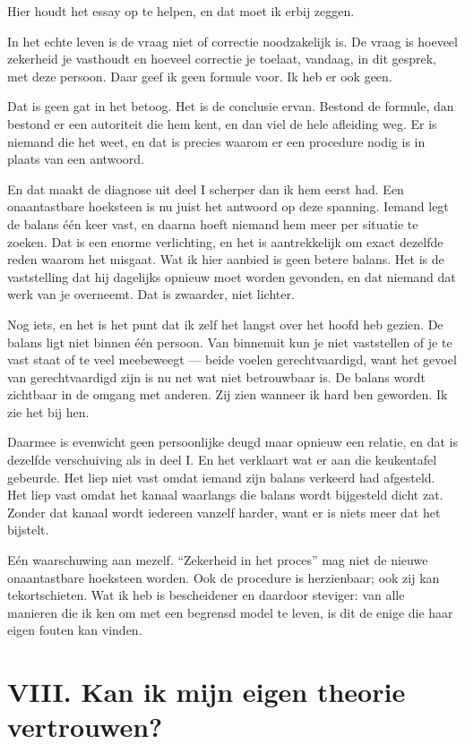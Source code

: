 \documentclass[11pt,a4paper]{article}
\begin{document}
Hier houdt het essay op te helpen, en dat moet ik erbij zeggen.

In het echte leven is de vraag niet of correctie noodzakelijk is. De vraag is hoeveel zekerheid je vasthoudt en hoeveel correctie je toelaat, vandaag, in dit gesprek, met deze persoon. Daar geef ik geen formule voor. Ik heb er ook geen.

Dat is geen gat in het betoog. Het is de conclusie ervan. Bestond de formule, dan bestond er een autoriteit die hem kent, en dan viel de hele afleiding weg. Er is niemand die het weet, en dat is precies waarom er een procedure nodig is in plaats van een antwoord.

En dat maakt de diagnose uit deel I scherper dan ik hem eerst had. Een onaantastbare hoeksteen is nu juist het antwoord op deze spanning. Iemand legt de balans één keer vast, en daarna hoeft niemand hem meer per situatie te zoeken. Dat is een enorme verlichting, en het is aantrekkelijk om exact dezelfde reden waarom het misgaat. Wat ik hier aanbied is geen betere balans. Het is de vaststelling dat hij dagelijks opnieuw moet worden gevonden, en dat niemand dat werk van je overneemt. Dat is zwaarder, niet lichter.

Nog iets, en het is het punt dat ik zelf het langst over het hoofd heb gezien. De balans ligt niet binnen één persoon. Van binnenuit kun je niet vaststellen of je te vast staat of te veel meebeweegt --- beide voelen gerechtvaardigd, want het gevoel van gerechtvaardigd zijn is nu net wat niet betrouwbaar is. De balans wordt zichtbaar in de omgang met anderen. Zij zien wanneer ik hard ben geworden. Ik zie het bij hen.

Daarmee is evenwicht geen persoonlijke deugd maar opnieuw een relatie, en dat is dezelfde verschuiving als in deel I. En het verklaart wat er aan die keukentafel gebeurde. Het liep niet vast omdat iemand zijn balans verkeerd had afgesteld. Het liep vast omdat het kanaal waarlangs die balans wordt bijgesteld dicht zat. Zonder dat kanaal wordt iedereen vanzelf harder, want er is niets meer dat het bijstelt.

Eén waarschuwing aan mezelf. \enquote{Zekerheid in het proces} mag niet de nieuwe onaantastbare hoeksteen worden. Ook de procedure is herzienbaar; ook zij kan tekortschieten. Wat ik heb is bescheidener en daardoor steviger: van alle manieren die ik ken om met een begrensd model te leven, is dit de enige die haar eigen fouten kan vinden.

\section*{VIII. Kan ik mijn eigen theorie vertrouwen?}
\end{document}
